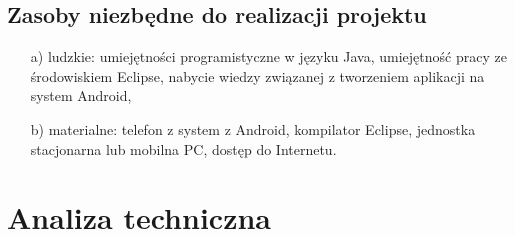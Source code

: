 \subsection{Zasoby niezbędne do realizacji projektu}
\begin{itemize}
\item [a)] ludzkie: umiejętności programistyczne w języku Java, umiejętność pracy ze środowiskiem Eclipse, nabycie wiedzy związanej z tworzeniem aplikacji na system Android,
\item [b)] materialne: telefon z system z Android, kompilator Eclipse, jednostka stacjonarna lub mobilna PC, dostęp do Internetu.
\end{itemize}

\section{Analiza techniczna}

